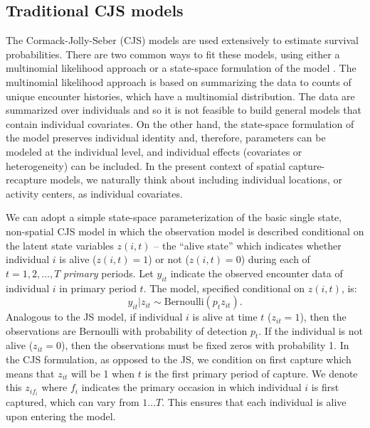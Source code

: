\subsection{Traditional CJS models}

The Cormack-Jolly-Seber (CJS) models are used extensively
to estimate survival probabilities.  There are two common ways to 
fit these models, using either a
multinomial likelihood approach \citep{lebreton_etal:1992} or a state-space
formulation of the model  \citep{gimenez:2007, royle:2008}.
The multinomial likelihood approach is based on summarizing the data
to counts of unique encounter histories, which have a multinomial
distribution. The data are summarized over individuals and so it is
not feasible to build general models that contain individual
covariates. On the other hand, the state-space formulation of the
model preserves individual identity and, therefore, parameters can be 
modeled at the individual level, and individual effects (covariates or
heterogeneity) can be included. In the present context of spatial
capture-recapture models, we naturally think about including
individual locations, or activity centers, as individual covariates. 


We can adopt a simple state-space parameterization of the
basic single state, non-spatial CJS model in which the observation model is
described conditional on the latent state variables $z(i,t)$ -- the
``alive state'' which indicates whether individual $i$ is
alive ($z(i,t)=1$) or not ($z(i,t)=0$) during each of $t=1,2,\ldots,T$
{\it primary} periods.
Let $y_{it}$ indicate the observed
encounter data of individual $i$ in primary period $t$. The
model, specified conditional on $z(i,t)$, is:
 \[
  y_{it}|z_{it} \sim \mbox{Bernoulli}(p_{t}z_{it}).
\]
Analogous to the JS model, if individual $i$ is alive at time $t$
($z_{it}=1$), then the observations are Bernoulli with probability of
detection $p_t$.  If the individual is not alive ($z_{it}=0$), then
the observations must be fixed zeros with probability 1.  In the CJS
formulation, as opposed to the JS, we condition on first capture which
means that $z_{it}$ will be 1 when $t$ is the first primary period of
capture.  We denote this $z_{i f_i}$ where $f_i$ indicates the primary
occasion in which individual $i$ is first captured, which can vary
from $1 \dots T$.  This ensures that each individual is alive upon
entering the model.

